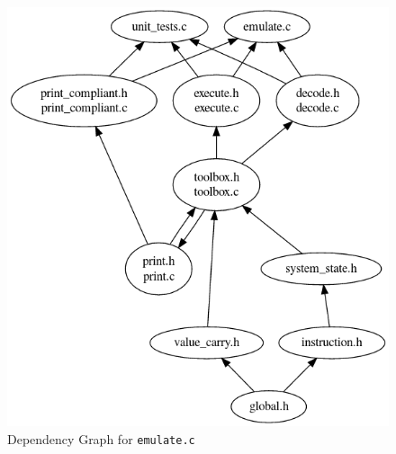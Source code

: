 \documentclass[10pt]{article}
\begin{document}
\begin{figure}[H]
\begin{minipage}{0.35\linewidth}
\centering
\includegraphics[scale=0.3]{Checkpoint/emulate.png}
\caption{Dependency Graph for \texttt{emulate.c}}

\end{minipage}
\end{figure}
\end{document}
